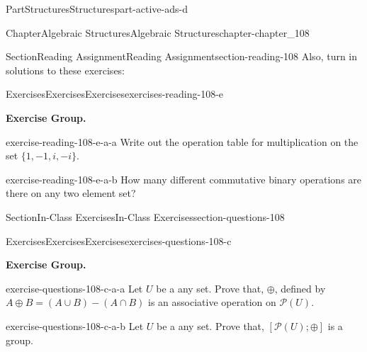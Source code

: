 \documentclass[oneside,10pt,]{book}
\numberwithin{equation}{section}
\begin{document}
\begin{partptx}{Part}{Structures}{}{Structures}{}{}{part-active-ads-d}
\begin{chapterptx}{Chapter}{Algebraic Structures}{}{Algebraic Structures}{}{}{chapter-chapter_108}
\begin{sectionptx}{Section}{Reading Assignment}{}{Reading Assignment}{}{}{section-reading-108}
Also, turn in solutions to these exercises:%
%
%
\typeout{************************************************}
\typeout{************************************************}
%
\begin{exercises-subsection-numberless}{Exercises}{Exercises}{}{Exercises}{}{}{exercises-reading-108-e}
\par\medskip\noindent%
\textbf{Exercise Group.}\space\space%
\begin{exercisegroup}
\begin{divisionexerciseeg}{1}{}{}{exercise-reading-108-e-a-a}%
Write out the operation table for multiplication on the set \(\{1,-1,i, -i\}\).%
\end{divisionexerciseeg}%
\begin{divisionexerciseeg}{2}{}{}{exercise-reading-108-e-a-b}%
How many different commutative binary operations are there on any two element set?%
\end{divisionexerciseeg}%
\end{exercisegroup}
\par\medskip\noindent
\end{exercises-subsection-numberless}
\end{sectionptx}
%
%
\typeout{************************************************}
\typeout{************************************************}
%
\begin{sectionptx}{Section}{In-Class Exercises}{}{In-Class Exercises}{}{}{section-questions-108}
%
%
%
\typeout{************************************************}
\typeout{************************************************}
%
\begin{exercises-subsection-numberless}{Exercises}{Exercises}{}{Exercises}{}{}{exercises-questions-108-c}
\par\medskip\noindent%
\textbf{Exercise Group.}\space\space%
\begin{exercisegroup}
\begin{divisionexerciseeg}{1}{}{}{exercise-questions-108-c-a-a}%
Let \(U\) be a any set.  Prove that, \(\oplus\), defined by \(A \oplus  B = (A \cup  B) - (A \cap  B)\) is an associative operation on \(\mathcal{P}(U)\).%
\end{divisionexerciseeg}%
\begin{divisionexerciseeg}{2}{}{}{exercise-questions-108-c-a-b}%
Let \(U\) be a any set.  Prove that,   \([\mathcal{P}(U); \oplus]\) is a group.%
\end{divisionexerciseeg}%

\end{exercisegroup}
\end{exercises-subsection-numberless}
\end{sectionptx}
\end{chapterptx}
\end{partptx}
\end{document}
